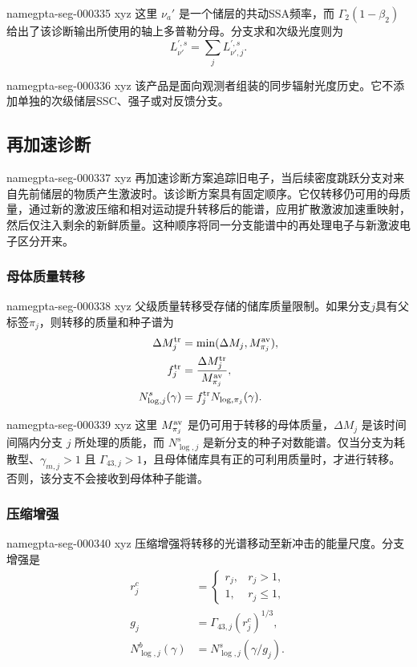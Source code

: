 \documentclass[twocolumn]{aastex702}
\makeatletter
\providecommand{\gptareaderanchor}[1]{\pdfdest name{#1} xyz}%
\providecommand{\gptareaderanchor}[1]{\special{pdf:dest (#1) [ @thispage /XYZ @xpos @ypos null ]}}%
\makeatother
\begin{document}
\gptareaderanchor{gpta-seg-000335}%
这里 \(\nu_a'\) 是一个储层的共动SSA频率，而 \(\Gamma_2(1-\beta_2)\) 给出了该诊断输出所使用的轴上多普勒分母。分支求和次级光度则为
\begin{equation}
L_{\nu'}^{\prime,s}=\sum_jL_{\nu',j}^{\prime,s}.
\end{equation}

\gptareaderanchor{gpta-seg-000336}%
该产品是面向观测者组装的同步辐射光度历史。它不添加单独的次级储层SSC、强子或对反馈分支。

\subsection{再加速诊断}


\gptareaderanchor{gpta-seg-000337}%
再加速诊断方案追踪旧电子，当后续密度跳跃分支对来自先前储层的物质产生激波时。该诊断方案具有固定顺序。它仅转移仍可用的母质量，通过新的激波压缩和相对运动提升转移后的能谱，应用扩散激波加速重映射，然后仅注入剩余的新鲜质量。这种顺序将同一分支能谱中的再处理电子与新激波电子区分开来。

\subsubsection{母体质量转移}


\gptareaderanchor{gpta-seg-000338}%
父级质量转移受存储的储库质量限制。如果分支\(j\)具有父标签\(\pi_j\)，则转移的质量和种子谱为
\begin{equation}
\begin{aligned}
\Delta M_j^{\rm tr}&=\min(\Delta M_j,M_{\pi_j}^{\rm av}),\\
f_j^{\rm tr}&=\frac{\Delta M_j^{\rm tr}}{M_{\pi_j}^{\rm av}},\\
N_{\log,j}^{s}(\gamma)&=f_j^{\rm tr}N_{\log,\pi_j}(\gamma).
\end{aligned}
\end{equation}

\gptareaderanchor{gpta-seg-000339}%
这里 \(M_{\pi_j}^{\rm av}\) 是仍可用于转移的母体质量，\(\Delta M_j\) 是该时间间隔内分支 \(j\) 所处理的质能，而 \(N_{\log,j}^{s}\) 是新分支的种子对数能谱。仅当分支为耗散型、\(\gamma_{m,j}>1\) 且 \(\Gamma_{43,j}>1\)，且母体储库具有正的可利用质量时，才进行转移。否则，该分支不会接收到母体种子能谱。

\subsubsection{压缩增强}


\gptareaderanchor{gpta-seg-000340}%
压缩增强将转移的光谱移动至新冲击的能量尺度。分支增强是
\begin{equation}
\begin{aligned}
r_j^{c}&=
\begin{cases}
r_j, & r_j>1,\\
1, & r_j\le1,
\end{cases}\\
g_j&=\Gamma_{43,j}(r_j^{c})^{1/3},\\
N_{\log,j}^{b}(\gamma)
&=N_{\log,j}^{s}(\gamma/g_j).
\end{aligned}
\end{equation}
\end{document}
